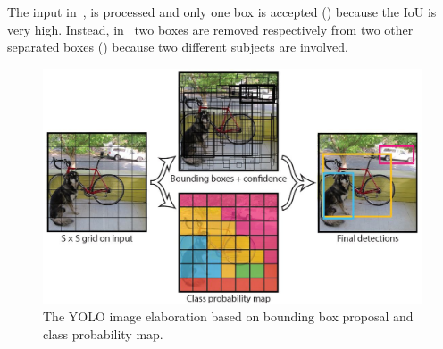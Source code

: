 The input in~, is processed and only one box is accepted () because the IoU is very high. Instead, in~ two boxes are removed respectively from two other separated boxes () because two different subjects are involved.

\begin{figure}[!h]
	\centering
	\includegraphics[width=0.8\linewidth]{images/howItWorks_yolo}
	\caption{The YOLO image elaboration based on bounding box proposal and class probability map.}
	\label{fig:howItWorks_yolo}
\end{figure}
